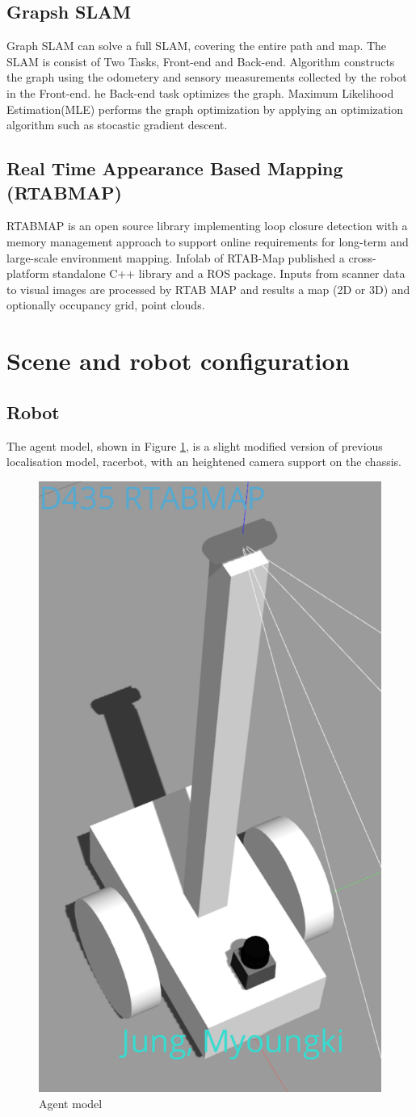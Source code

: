 \documentclass[10pt,journal,compsoc]{IEEEtran}
\begin{document}
\subsection{Grapsh SLAM}
Graph SLAM can solve a full SLAM, covering the entire path and map. The SLAM is consist of Two Tasks, Front-end and Back-end. Algorithm constructs the graph using the odometery and sensory measurements collected by the robot in the Front-end. he Back-end task optimizes the graph. Maximum Likelihood Estimation(MLE) performs the graph optimization by applying an optimization algorithm such as stocastic gradient descent.

\subsection{Real Time Appearance Based Mapping (RTABMAP)}
RTABMAP is an open source library implementing loop closure detection with a memory management approach to support online requirements for long-term and large-scale environment mapping\cite{Labbe2018}.
Infolab of RTAB-Map published a cross-platform standalone C++ library and a ROS package. Inputs from scanner data to visual images are processed by RTAB MAP and results a map (2D or 3D) and optionally occupancy grid, point clouds.

\section{Scene and robot configuration}
\subsection{Robot}
The agent model, shown in Figure \ref{fig:racersupportarmd435}, is a slight modified version of previous localisation model, racerbot, with an heightened camera support on the chassis.

\begin{figure}[thpb]
      \centering
      \includegraphics[width=.5\linewidth]{./img/racersupportarmd435.png}
      \caption{Agent model}
      \label{fig:racersupportarmd435}
\end{figure}
\end{document}
